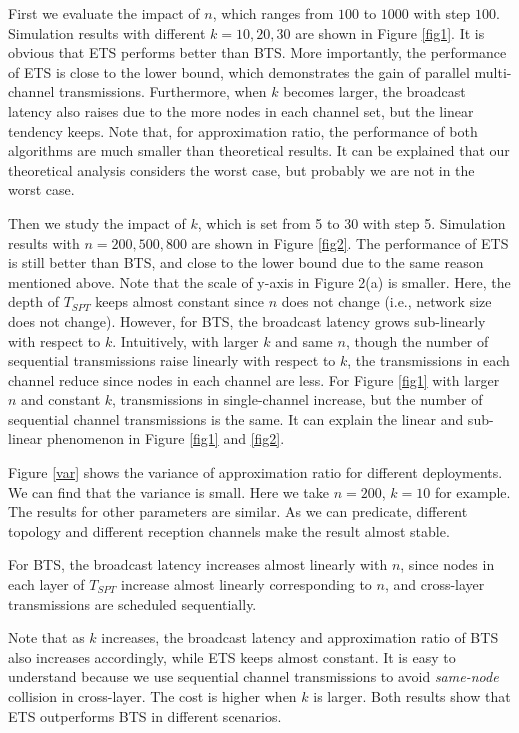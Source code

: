 \documentclass[10pt, conference]{IEEEtran}
\begin{document}
First we evaluate the impact of $n$, which ranges from $100$ to
$1000$ with step $100$. Simulation results with different $k =
10, 20, 30$ are shown in Figure \ref{fig1}. It is obvious that
ETS performs better than BTS. More importantly, the performance
of ETS is close to the lower bound, which demonstrates the gain
of parallel multi-channel transmissions. Furthermore, when $k$
becomes larger, the broadcast latency also raises due to the
more nodes in each channel set, but the linear tendency keeps.
Note that, for approximation ratio, the performance of both
algorithms are much smaller than theoretical results. It can be
explained that our theoretical analysis considers the worst
case, but probably we are not in the worst case. 


Then we study the impact of $k$, which is set from 5 to 30 with
step 5. Simulation results with $n = 200, 500, 800$ are shown
in Figure \ref{fig2}. The performance of ETS is still better
than BTS, and close to the lower bound due to the same reason
mentioned above. Note that the scale of y-axis in Figure 2(a)
is smaller. Here, the depth of $T_{SPT}$ keeps almost constant
since $n$ does not change (i.e., network size does not change).
However, for BTS, the broadcast latency grows sub-linearly with
respect to $k$. Intuitively, with larger $k$ and same $n$,
though the number of sequential transmissions raise linearly
with respect to $k$, the transmissions in each channel reduce
since nodes in each channel are less. For Figure \ref{fig1}
with larger $n$ and constant $k$, transmissions in
single-channel increase, but the number of sequential channel
transmissions is the same. It can explain the linear and
sub-linear phenomenon in Figure \ref{fig1} and \ref{fig2}.

\iffalse
Figure \ref{var} shows the variance of approximation ratio for different deployments.
We can find that the variance is small. Here we take $n=200$, $k=10$ for
example. The results for other parameters are similar. As we can
predicate, different topology and different reception channels
make the result almost stable.

For BTS, the broadcast latency increases almost
linearly with $n$, since nodes in each layer of $T_{SPT}$
increase almost linearly corresponding to $n$, and cross-layer
transmissions are scheduled sequentially.

 Note that as $k$ increases, the
broadcast latency and approximation ratio of BTS also increases
accordingly, while ETS keeps almost constant. It is easy to
understand because we use sequential channel transmissions to
avoid \emph{same-node} collision in cross-layer. The cost is
higher when $k$ is larger. Both results show that ETS
outperforms BTS in different scenarios.
\end{document}
